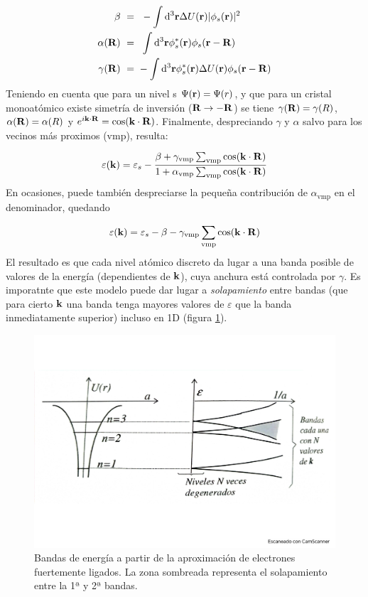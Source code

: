 \begin{equation}
    \begin{split}
        \beta \ = \ &  \ - \int   \mathrm{d}^3 \mathbf{r} \Delta U (\mathbf{r}) |\phi_s (\mathbf{r}) |^2 \\
        \alpha (\mathbf{R}) \ = \ & \ \int \mathrm{d}^3\mathbf{r} \phi_s^* (\mathbf{r}) \phi_s (\mathbf{r}-\mathbf{R}) \\
        \gamma (\mathbf{R}) \ = \ & - \int \mathrm{d}^3 \mathbf{r} \phi_s^* (\mathbf{r}) \Delta U (\mathbf{r}) \phi_s (\mathbf{r} - \mathbf{R})
    \end{split}
\end{equation}
Teniendo en cuenta que para un nivel s $\Psi (\mathbf{r}) = \Psi (r)$, y que para un cristal monoatómico existe simetría de inversión ($\mathbf{R} \rightarrow - \mathbf{R}$) se tiene $\gamma (\mathbf{R}) = \gamma (R)$, $\alpha (\mathbf{R}) = \alpha (R)$ y $e^{i \mathbf{k} \cdot \mathbf{R}} = \cos (\mathbf{k} \cdot \mathbf{R})$. Finalmente, despreciando $\gamma$ y $\alpha$ salvo para los vecinos más proximos (vmp), resulta:

\begin{equation}
    \varepsilon(\mathbf{k}) = \varepsilon_s - \frac{\beta + \gamma_{\text{vmp}} \sum_{\text{vmp}} \cos (\mathbf{k} \cdot \mathbf{R})}{1+\alpha_{\text{vmp}} \sum_{\text{vmp}} \cos (\mathbf{k} \cdot \mathbf{R})}
\end{equation}
En ocasiones, puede también despreciarse la pequeña contribución de $\alpha_{\text{vmp}}$ en el denominador, quedando

\begin{equation}
    \varepsilon(\mathbf{k}) = \varepsilon_s - \beta - \gamma_{\text{vmp}} \sum_{\text{vmp}} \cos (\mathbf{k}\cdot \mathbf{R})
\end{equation}
El resultado es que cada nivel atómico discreto da lugar a una banda posible de valores de la energía (dependientes de $\mathbf{k}$), cuya anchura está controlada por $\gamma$. Es imporatnte que este modelo puede dar lugar a \textit{solapamiento} entre bandas (que para cierto $\mathbf{k}$ una banda tenga mayores valores de $\varepsilon$ que la banda inmediatamente superior) incluso en 1D (figura \ref{Fig:07-06}). 


\begin{figure}[h!] \centering
    \includegraphics[scale=0.35]{Cuerpo/Ch_07/Fotos libro 6.pdf}
    \caption{Bandas de energía a partir de la aproximación de electrones fuertemente ligados. La zona sombreada representa el solapamiento entre la 1ª y 2ª bandas.}
    \label{Fig:07-06}
\end{figure}    

